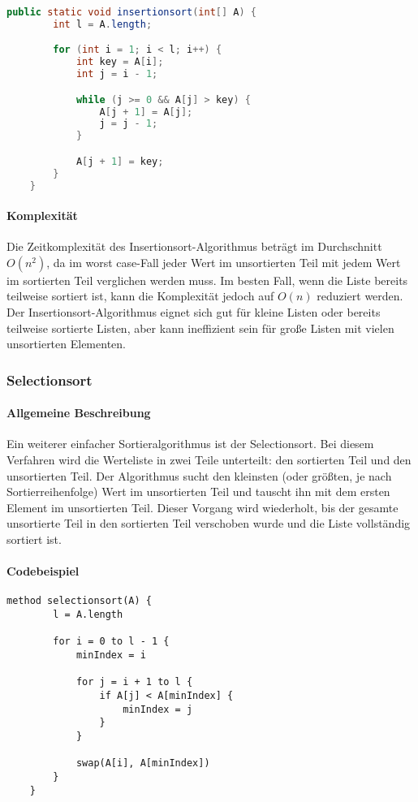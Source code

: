 \documentclass{article}
\begin{document}
	\begin{lstlisting}[language=Java, caption=Der Insertionsort-Algorithmus in Java]
	public static void insertionsort(int[] A) {
		int l = A.length;

		for (int i = 1; i < l; i++) {
			int key = A[i];
			int j = i - 1;

			while (j >= 0 && A[j] > key) {
				A[j + 1] = A[j];
				j = j - 1;
			}

			A[j + 1] = key;
		}
	}
	\end{lstlisting}

	\paragraph{Komplexität}
	Die Zeitkomplexität des Insertionsort-Algorithmus beträgt im Durchschnitt \textbf{$O(n^2)$}, da im worst case-Fall jeder Wert im unsortierten Teil mit jedem Wert im sortierten Teil verglichen werden muss. Im besten Fall, wenn die Liste bereits teilweise sortiert ist, kann die Komplexität jedoch auf \textbf{$O(n)$} reduziert werden. Der Insertionsort-Algorithmus eignet sich gut für kleine Listen oder bereits teilweise sortierte Listen, aber kann ineffizient sein für große Listen mit vielen unsortierten Elementen.


	\subsubsection{Selectionsort}
	\paragraph{Allgemeine Beschreibung}
Ein weiterer einfacher Sortieralgorithmus ist der Selectionsort. Bei diesem Verfahren wird die Werteliste in zwei Teile unterteilt: den sortierten Teil und den unsortierten Teil. Der Algorithmus sucht den kleinsten (oder größten, je nach Sortierreihenfolge) Wert im unsortierten Teil und tauscht ihn mit dem ersten Element im unsortierten Teil. Dieser Vorgang wird wiederholt, bis der gesamte unsortierte Teil in den sortierten Teil verschoben wurde und die Liste vollständig sortiert ist.

	\paragraph{Codebeispiel}
	\begin{lstlisting}[caption=Der Selectionsort-Algorithmus in einfachem Pseudocode]
	method selectionsort(A) {
		l = A.length

		for i = 0 to l - 1 {
			minIndex = i

			for j = i + 1 to l {
				if A[j] < A[minIndex] {
					minIndex = j
				}
			}

			swap(A[i], A[minIndex])
		}
	}
	\end{lstlisting}
\end{document}
